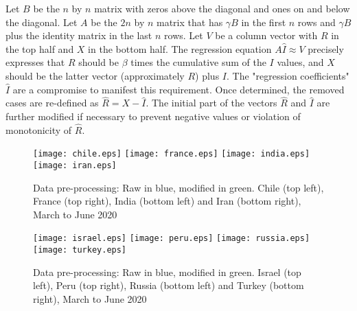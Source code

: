 \documentclass{article}
\begin{document}
{Let $B$ be the $n$ by $n$ matrix with zeros above the diagonal and ones on and below the diagonal. Let $A$ be the $2 n$ by $n$ matrix that has $\gamma B$ in the first $n$ rows and $\gamma B$ plus the identity matrix in the last $n$ rows. Let $V$ be a column vector with $R$ in the top half and $X$ in the bottom half. The regression equation $A \hat{I} \approx V$
precisely expresses that $R$ should be $\beta$ times the cumulative sum of the $I$ values, and $X$ should be the latter vector (approximately $R$) plus $I$. The "regression coefficients" $\hat{I}$ are a compromise to manifest this requirement. Once determined, the removed cases are re-defined as $\hat{R}=X-\hat{I}$. The initial part of the vectors $\hat{R}$ and $\hat{I}$ are further modified if necessary to prevent negative values or violation of monotonicity of $\hat{R}$.

\begin{figure}
\begin{center}
{\texttt{[image: chile.eps]}}
\qquad
{\texttt{[image: france.eps]}}
\qquad
{\texttt{[image: india.eps]}}
\qquad
{\texttt{[image: iran.eps]}}
\end{center}
\begin{center}
\caption{Data pre-processing: Raw in blue, modified in green. Chile (top left), France (top right), India (bottom left) and Iran (bottom right), March to June 2020
}
\label{fig:chile_france_india_iran_07_06_2020}
\end{center}
\end{figure}

\begin{figure}
    \begin{center}
        {\texttt{[image: israel.eps]}}
        \qquad
        {\texttt{[image: peru.eps]}}
        \qquad
    {\texttt{[image: russia.eps]}}
    \qquad
    {\texttt{[image: turkey.eps]}}
    \end{center}
    \begin{center}
    \caption{Data pre-processing: Raw in blue, modified in green. Israel (top left), Peru (top right), Russia (bottom left) and Turkey (bottom right), March to June 2020
    }
\label{fig:israel_peru_russia_turkey_07_06_2020}
    \end{center}
\end{figure}


}
\end{document}
